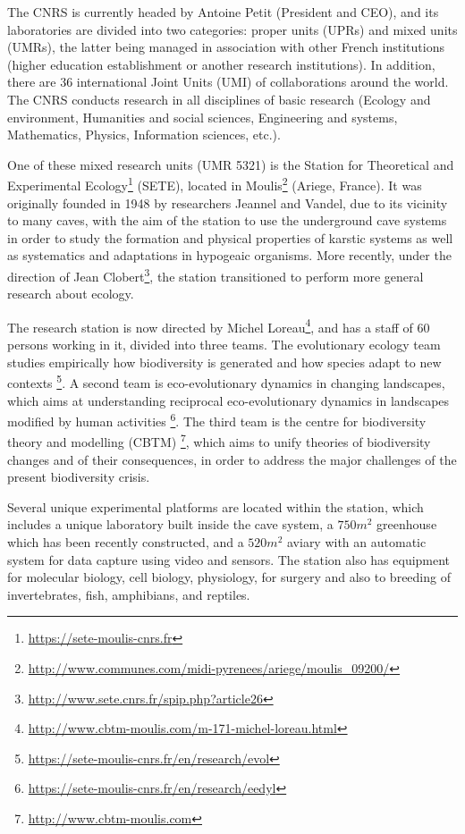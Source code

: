 \documentclass{article}
\begin{document}
The CNRS is currently headed by Antoine Petit (President and CEO), and its laboratories are divided into two categories: proper units (UPRs) and mixed units (UMRs), the latter being managed in association with other French institutions (higher education establishment or another research institutions). In addition, there are 36 international Joint Units (UMI) of collaborations around the world. The CNRS conducts research in all disciplines of basic research (Ecology and environment, Humanities and social sciences, Engineering and systems, Mathematics, Physics, Information sciences, etc.).

One of these mixed research units (UMR 5321) is the Station for Theoretical and Experimental Ecology\footnote{\url{https://sete-moulis-cnrs.fr}} (SETE), located in Moulis\footnote{\url{http://www.communes.com/midi-pyrenees/ariege/moulis_09200/}} (Ariege, France). It was originally founded in 1948 by researchers Jeannel and Vandel, due to its vicinity to many caves, with the aim of the station to use the underground cave systems in order to study the formation and physical properties of karstic systems as well as systematics and adaptations in hypogeaic organisms. More recently, under the direction of Jean Clobert\footnote{\url{http://www.sete.cnrs.fr/spip.php?article26}}, the station transitioned to perform more general research about ecology.

The research station is now directed by Michel Loreau\footnote{\url{http://www.cbtm-moulis.com/m-171-michel-loreau.html}}, and has a staff of 60 persons working in it, divided into three teams.
The evolutionary ecology team studies empirically how biodiversity is generated and how species adapt to new contexts \footnote{\url{https://sete-moulis-cnrs.fr/en/research/evol}}. A second team is eco-evolutionary dynamics in changing landscapes, which aims at understanding reciprocal eco-evolutionary dynamics in landscapes modified by human activities \footnote{\url{https://sete-moulis-cnrs.fr/en/research/eedyl}}. The third team is the centre for biodiversity theory and modelling (CBTM) \footnote{\url{http://www.cbtm-moulis.com}}, which aims to unify theories of biodiversity changes and of their consequences, in order to address the major challenges of the present biodiversity crisis.

Several unique experimental platforms are located within the station, which includes a unique laboratory built inside the cave system, a $750m^2$ greenhouse which has been recently constructed, and a $520m^2$ aviary with an automatic system for data capture using video and sensors. The station also has equipment for molecular biology, cell biology, physiology, for surgery and also to breeding of invertebrates, fish, amphibians, and reptiles. 
\end{document}
